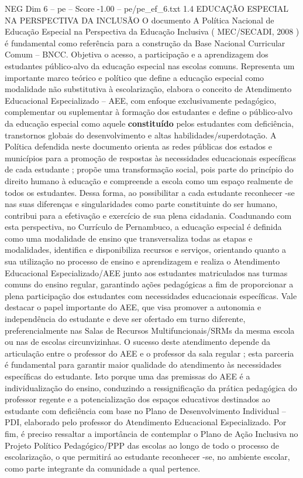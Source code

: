 \begin{textsample}{NEG Dim 6 – pe – Score -1.00 – pe/pe\_ef\_6.txt}  \label{ex:f6_neg_033}
1.4 EDUCAÇÃO ESPECIAL NA PERSPECTIVA DA INCLUSÃO O documento A Política Nacional de Educação Especial na Perspectiva da Educação Inclusiva ( MEC/SECADI, 2008 ) é fundamental como referência para a construção da Base Nacional Curricular Comum – BNCC.
Objetiva o acesso, a participação e a aprendizagem dos estudantes público-alvo da educação especial nas escolas comuns.
Representa um importante marco teórico e político que define a educação especial como modalidade não substitutiva à escolarização, elabora o conceito de Atendimento Educacional Especializado – AEE, com enfoque exclusivamente pedagógico, complementar ou suplementar à formação dos estudantes e define o público-alvo da educação especial como aquele \textbf{constituído} pelos estudantes com deficiência, transtornos globais do desenvolvimento e altas habilidades/superdotação.
A Política defendida neste documento orienta as redes públicas dos estados e municípios para a promoção de respostas às necessidades educacionais específicas de cada estudante ; propõe uma transformação social, pois parte do princípio do direito humano à educação e compreende a escola como um espaço realmente de todos os estudantes.
Dessa forma, ao possibilitar a cada estudante reconhecer -se nas suas diferenças e singularidades como parte constituinte do ser humano, contribui para a efetivação e exercício de sua plena cidadania.
Coadunando com esta perspectiva, no Currículo de Pernambuco, a educação especial é definida como uma modalidade de ensino que transversaliza todas as etapas e modalidades, identifica e disponibiliza recursos e serviços, orientando quanto a sua utilização no processo de ensino e aprendizagem e realiza o Atendimento Educacional Especializado/AEE junto aos estudantes matriculados nas turmas comuns do ensino regular, garantindo ações pedagógicas a fim de proporcionar a plena participação dos estudantes com necessidades educacionais específicas.
Vale destacar o papel importante do AEE, que visa promover a autonomia e independência do estudante e deve ser ofertado em turno diferente, preferencialmente nas Salas de Recursos Multifuncionais/SRMs da mesma escola ou nas de escolas circunvizinhas.
O sucesso deste atendimento depende da articulação entre o professor do AEE e o professor da sala regular ; esta parceria é fundamental para garantir maior qualidade do atendimento às necessidades específicas do estudante.
Isto porque uma das premissas do AEE é a individualização do ensino, conduzindo a ressignificação da prática pedagógica do professor regente e a potencialização dos espaços educativos destinados ao estudante com deficiência com base no Plano de Desenvolvimento Individual – PDI, elaborado pelo professor do Atendimento Educacional Especializado.
Por fim, é preciso ressaltar a importância de contemplar o Plano de Ação Inclusiva no Projeto Político Pedagógico/PPP das escolas ao longo de todo o processo de escolarização, o que permitirá ao estudante reconhecer -se, no ambiente escolar, como parte integrante da comunidade a qual pertence.

\end{textsample}
